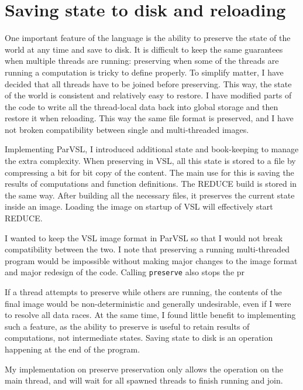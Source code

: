 \section{Saving state to disk and reloading}
\label{sec:preserve}

One important feature of the language is the ability to preserve the state of the world at any
time and save to disk. It is difficult to keep the same guarantees when multiple threads are running:
preserving when some of the threads are running a computation is tricky to define properly. To simplify
matter, I have decided that all threads have to be joined before preserving. This way, the state of
the world is consistent and relatively easy to restore. I have modified parts of the code to write
all the thread-local data back into global storage and then restore it when reloading. This way the same
file format is preserved, and I have not broken compatibility between single and multi-threaded images.

Implementing ParVSL, I introduced additional state and book-keeping to manage the extra complexity.
When preserving in VSL, all this state is stored to a file by compressing a bit for bit copy of the
content. The main use for this is saving the results of computations and function definitions.
The REDUCE build is stored in the same way. After building all the necessary files,
it preserves the current state inside an image. Loading the image on startup of VSL will effectively
start REDUCE.

I wanted to keep the VSL image format in ParVSL so that I would not break compatibility between the two.
I note that preserving a running multi-threaded program would be impossible without making major changes
to the image format and major redesign of the code. Calling \texttt{preserve} also stops the pr

 If a thread attempts to preserve while others
are running, the contents of the final image would be non-deterministic and generally undesirable,
even if I were to resolve all data races. At the same time, I found little benefit to implementing such
a feature, as the ability to preserve is useful to retain results of computations, not intermediate states.
Saving state to disk is an operation happening at the end of the program.

My implementation on preserve preservation only allows the operation on the main thread, and will wait
for all spawned threads to finish running and join.